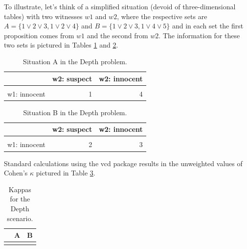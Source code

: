 \documentclass[
  10pt,
]{scrartcl}
\begin{document}
To illustrate, let's think of a simplified situation (devoid of three-dimensional tables) with two witnesses \(w1\) and \(w2\), where the respective sets are
\(A = \{1 \vee 2 \vee 3, 1\vee 2 \vee 4\}\) and
\(B = \{1 \vee 2 \vee 3, 1\vee 4 \vee 5\}\) and in each set the first proposition comes from \(w1\) and the second from \(w2\). The information for these two sets is pictured in Tables \ref{tab:AkableTab} and \ref{tab:BkableTab}.

\begin{table}[H]

\caption{\label{tab:AkableTab}Situation A in the Depth problem.}
\centering
\begin{tabular}[t]{lrr}
\toprule
  & w2: suspect & w2: innocent\\
\midrule
\cellcolor{gray!6}{w1:suspect} & \cellcolor{gray!6}{2} & \cellcolor{gray!6}{1}\\
w1: innocent & 1 & 4\\
\bottomrule
\end{tabular}
\end{table}

\begin{table}[H]

\caption{\label{tab:BkableTab}Situation B in the Depth problem.}
\centering
\begin{tabular}[t]{lrr}
\toprule
  & w2: suspect & w2: innocent\\
\midrule
\cellcolor{gray!6}{w1: suspect} & \cellcolor{gray!6}{1} & \cellcolor{gray!6}{2}\\
w1: innocent & 2 & 3\\
\bottomrule
\end{tabular}
\end{table}

\noindent Standard calculations using the \textsf{vcd} package results in the unweighted values of Cohen's \(\kappa\) pictured in Table \ref{tab:kappas2table}.

\begin{table}[H]

\caption{\label{tab:kappas2table}Kappas for the Depth scenario.}
\centering
\begin{tabular}[t]{lrr}
\toprule
  & A & B\\
\midrule
\cellcolor{gray!6}{value} & \cellcolor{gray!6}{0.467} & \cellcolor{gray!6}{-0.067}\\
\bottomrule
\end{tabular}
\end{table}
\end{document}
